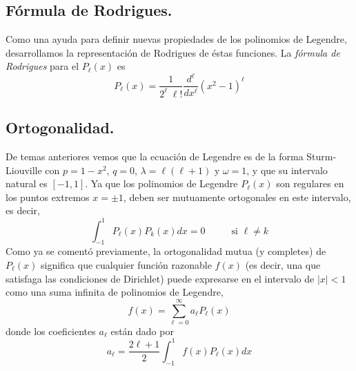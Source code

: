 \subsection*{Fórmula de Rodrigues.}
Como una ayuda para definir nuevas propiedades de los polinomios de Legendre, desarrollamos la representación de Rodrigues de éstas funciones. La \emph{fórmula de Rodrigues} para el $P_{\ell} (x)$ es
\begin{equation}
P_{\ell} (x) = \dfrac{1}{2^{\ell} \; \ell !} \dfrac{d^{\ell}}{d x^{\ell}} (x^{2} - 1)^{\ell}
\label{eq:ecuacion_009}
\end{equation}
\subsection*{Ortogonalidad.}
De temas anteriores vemos que la ecuación de Legendre es de la forma Sturm-Liouville con $p = 1 - x^{2}$, $q = 0$, $\lambda = \ell (\ell + 1)$ y $\omega = 1$, y que su intervalo natural es $[-1, 1 ]$. Ya que los polinomios de Legendre $P_{\ell} (x)$ son regulares en los puntos extremos $x = \pm 1$, deben ser mutuamente ortogonales en este intervalo, es decir,
\begin{equation}
\int_{-1}^{1} P_{\ell}(x) P_{k}(x) dx = 0 \hspace{1cm} \mbox{ si $\ell \neq k$}
\label{eq:ecuacion_012}
\end{equation}
Como ya se comentó previamente, la ortogonalidad mutua (y completes) de  $P_{\ell} (x)$ significa que cualquier función razonable $f(x)$ (es decir, una que satisfaga las condiciones de Dirichlet) puede expresarse en el intervalo de $\vert x \vert <1$ como una suma infinita de polinomios de Legendre,
\begin{equation}
f(x) = \sum_{\ell = 0}^{\infty} a_{\ell} P_{\ell} (x)
\label{eq:ecuacion_013}
\end{equation}
donde los coeficientes $a_{\ell}$ están dado por
\begin{equation}
a_{\ell} = \dfrac{2 \ell + 1}{2} \int_{-1}^{1} f(x) P_{\ell} (x) dx
\label{eq:ecuacion_014}
\end{equation}
